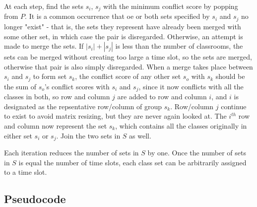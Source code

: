 \documentclass[11pt, oneside]{article}   	%
\begin{document}
 At each step, find the sets $s_i$, $s_j$ with the minimum conflict score by popping from $P$. It is a common occurrence that oe or both sets specified by $s_i$ and $s_j$ no longer "exist" - that is, the sets they represent have already been merged with some other set, in which case the pair is disregarded. Otherwise, an attempt is made to merge the sets. If $|s_i| + |s_j|$ is less than the number of classrooms, the sets can be merged without creating too large a time slot, so the sets are merged, otherwise that pair is also simply disregarded. When a merge takes place between $s_i$ and $s_j$ to form set $s_k$, the conflict score of any other set $s_o$ with $s_k$ should be the sum of $s_o$'s conflict scores with $s_i$ and $s_j$, since it now conflicts with all the classes in both, so row and column $j$ are added to row and column $i$, and $i$ is designated as the repsentative row/column of group $s_k$. Row/column $j$ continue to exist to avoid matrix resizing, but they are never again looked at. The $i^{th}$ row and column now represent the set $s_k$, which contains all the classes originally in either set $s_i$ or $s_j$. Join the two sets in $S$ as well.

Each iteration reduces the number of sets in $S$ by one. Once the number of sets in $S$ is equal the number of time slots, each class set can be arbitrarily assigned to a time slot.

\subsection{Pseudocode}
\begin{algorithm}
\end{algorithm}

\begin{algorithm}
\end{algorithm}
\end{document}
